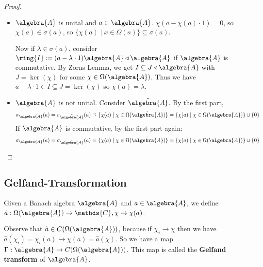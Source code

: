 \documentclass[a4paper]{article}
\begin{document}
\begin{proof}~
	\begin{itemize}
		\item $\algebra{A}$ is unital and $a \in \algebra{A}$. $\chi(a - \chi(a) \cdot 1) = 0$, so $\chi(a) \in \sigma(a)$, so $\{ \chi(a) \mid x \in \Omega(a) \}  \subseteq \sigma(a)$.
		
		Now if $\lambda \in \sigma(a)$, consider $\ring{I} \coloneq (a - \lambda \cdot 1) \algebra{A} \triangleleft \algebra{A}$ if $\algebra{A}$ is commutative.
		By Zorns Lemma, we get $I \subseteq J \triangleleft \algebra{A}$ with $J = \ker(\chi)$ for some $\chi \in \Omega(\algebra{A})$. Thus we have $a - \lambda \cdot 1 \in \ring{I} \subseteq J = \ker(\chi)$ so $\chi(a) = \lambda$.

		\item $\algebra{A}$ is not unital. Consider $\tilde{\algebra{A}}$. By the first part,
		\begin{equation*}
			\sigma_\algebra{A}(a) = \sigma_{\tilde{\algebra{A}}}(a) \supseteq \{\chi(a) \mid \chi \in \Omega(\tilde{\algebra{A}}) \} = \{\chi(a) \mid \chi \in \Omega(\algebra{A}) \} \cup \{0\}
		\end{equation*}
		If $\algebra{A}$ is commutative, by the first part again: 
		\begin{equation*}
			\sigma_\algebra{A}(a) = \sigma_{\tilde{\algebra{A}}}(a) = \{\chi(a) \mid \chi \in \Omega(\tilde{\algebra{A}})\} = \{\chi(a) \mid \chi \in \Omega(\algebra{A}) \} \cup \{0\}
		\end{equation*}
	\end{itemize}
\end{proof}

\subsection{Gelfand-Transformation}

\begin{definition}
	Given a Banach algebra $\algebra{A}$ and $a \in \algebra{A}$, we define $\hat a: \Omega(\algebra{A}) \to \mathds{C}, \chi \mapsto \chi(a)$.
\end{definition}

Observe that $\hat a \in C(\Omega(\algebra{A}))$, because if $\chi_i \to \chi$ then we have $\hat a(\chi_i) = \chi_i(a) \to \chi(a) = \hat a(\chi)$. So we have a map $\Gamma: \algebra{A} \to C(\Omega(\algebra{A}))$. This map is called the \textbf{Gelfand transform} of $\algebra{A}$. 
\end{document}
